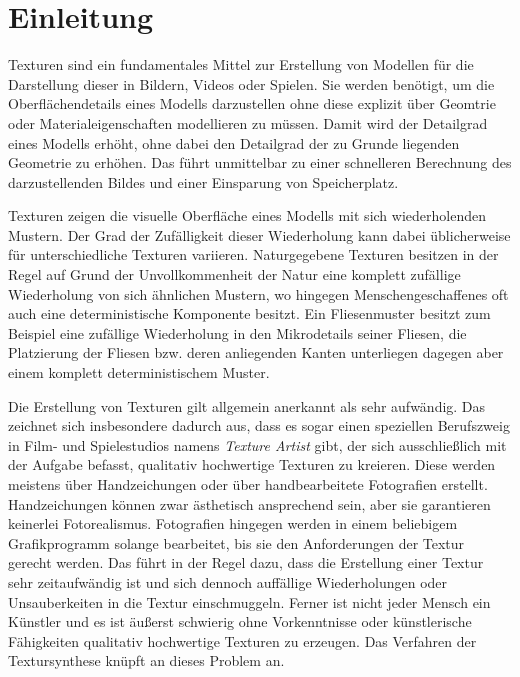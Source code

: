 \section{Einleitung}

Texturen sind ein fundamentales Mittel zur Erstellung von Modellen für die Darstellung dieser in Bildern, Videos oder Spielen.
Sie werden benötigt, um die Oberflächendetails eines Modells darzustellen ohne diese explizit über Geomtrie oder Materialeigenschaften modellieren zu müssen.
Damit wird der Detailgrad eines Modells erhöht, ohne dabei den Detailgrad der zu Grunde liegenden Geometrie zu erhöhen.
Das führt unmittelbar zu einer schnelleren Berechnung des darzustellenden Bildes und einer Einsparung von Speicherplatz.

Texturen zeigen die visuelle Oberfläche eines Modells mit sich wiederholenden Mustern.
Der Grad der Zufälligkeit dieser Wiederholung kann dabei üblicherweise für unterschiedliche Texturen variieren.
Naturgegebene Texturen besitzen in der Regel auf Grund der Unvollkommenheit der Natur eine komplett zufällige Wiederholung von sich ähnlichen Mustern, wo hingegen Menschengeschaffenes oft auch eine deterministische Komponente besitzt.
Ein Fliesenmuster besitzt zum Beispiel eine zufällige Wiederholung in den Mikrodetails seiner Fliesen, die Platzierung der Fliesen bzw. deren anliegenden Kanten unterliegen dagegen aber einem komplett deterministischem Muster.

Die Erstellung von Texturen gilt allgemein anerkannt als sehr aufwändig.
Das zeichnet sich insbesondere dadurch aus, dass es sogar einen speziellen Berufszweig in Film- und Spielestudios namens \emph{Texture Artist} gibt, der sich ausschließlich mit der Aufgabe befasst, qualitativ hochwertige Texturen zu kreieren.
Diese werden meistens über Handzeichungen oder über handbearbeitete Fotografien erstellt.
Handzeichungen können zwar ästhetisch ansprechend sein, aber sie garantieren keinerlei Fotorealismus.
Fotografien hingegen werden in einem beliebigem Grafikprogramm solange bearbeitet, bis sie den Anforderungen der Textur gerecht werden.
Das führt in der Regel dazu, dass die Erstellung einer Textur sehr zeitaufwändig ist und sich dennoch auffällige Wiederholungen oder Unsauberkeiten in die Textur einschmuggeln.
Ferner ist nicht jeder Mensch ein Künstler und es ist äußerst schwierig ohne Vorkenntnisse oder künstlerische Fähigkeiten qualitativ hochwertige Texturen zu erzeugen.
Das Verfahren der Textursynthese knüpft an dieses Problem an.
